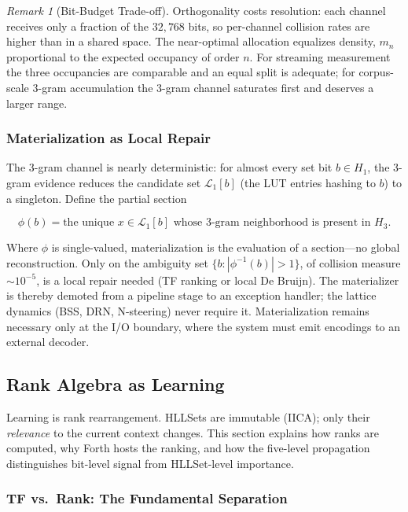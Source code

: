 \documentclass[11pt,a4paper]{article}
\theoremstyle{remark}
\newtheorem{remark}{Remark}[section]
\begin{document}
\begin{remark}[Bit-Budget Trade-off]
Orthogonality costs resolution: each channel receives only a fraction of the
$32{,}768$ bits, so per-channel collision rates are higher than in a shared
space. The near-optimal allocation equalizes density, $m_n$ proportional to the
expected occupancy of order $n$. For streaming measurement the three
occupancies are comparable and an equal split is adequate; for corpus-scale
3-gram accumulation the 3-gram channel saturates first and deserves a larger
range.
\end{remark}

\subsubsection{Materialization as Local Repair}

The 3-gram channel is nearly deterministic: for almost every set bit
$b \in H_1$, the 3-gram evidence reduces the candidate set $\mathcal{L}_1[b]$
(the LUT entries hashing to $b$) to a singleton. Define the partial section

\begin{equation}
  \phi(b) = \text{the unique } x \in \mathcal{L}_1[b]
  \text{ whose 3-gram neighborhood is present in } H_3.
\end{equation}

Where $\phi$ is single-valued, materialization is the evaluation of a
section---no global reconstruction. Only on the ambiguity set
$\{b : |\phi^{-1}(b)| > 1\}$, of collision measure $\sim 10^{-5}$, is a local
repair needed (TF ranking or local De Bruijn). The materializer is thereby
demoted from a pipeline stage to an exception handler; the lattice dynamics
(BSS, DRN, N-steering) never require it. Materialization remains necessary only
at the I/O boundary, where the system must emit encodings to an external
decoder.

\subsection{Rank Algebra as Learning}

Learning is rank rearrangement. HLLSets are immutable (IICA); only their
\textit{relevance} to the current context changes. This section explains how ranks
are computed, why Forth hosts the ranking, and how the five-level propagation
distinguishes bit-level signal from HLLSet-level importance.

\subsubsection{TF vs.\ Rank: The Fundamental Separation}
\end{document}
